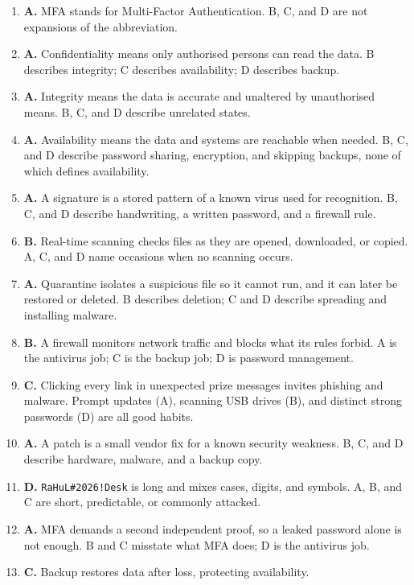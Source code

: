 \begin{enumerate}[label=\textbf{Q\arabic*.}, leftmargin=*]
\item \textbf{A.} MFA stands for Multi-Factor Authentication. B, C, and D are
  not expansions of the abbreviation.
\item \textbf{A.} Confidentiality means only authorised persons can read the
  data. B describes integrity; C describes availability; D describes backup.
\item \textbf{A.} Integrity means the data is accurate and unaltered by
  unauthorised means. B, C, and D describe unrelated states.
\item \textbf{A.} Availability means the data and systems are reachable when
  needed. B, C, and D describe password sharing, encryption, and skipping
  backups, none of which defines availability.
\item \textbf{A.} A signature is a stored pattern of a known virus used for
  recognition. B, C, and D describe handwriting, a written password, and a
  firewall rule.
\item \textbf{B.} Real-time scanning checks files as they are opened,
  downloaded, or copied. A, C, and D name occasions when no scanning occurs.
\item \textbf{A.} Quarantine isolates a suspicious file so it cannot run, and
  it can later be restored or deleted. B describes deletion; C and D describe
  spreading and installing malware.
\item \textbf{B.} A firewall monitors network traffic and blocks what its
  rules forbid. A is the antivirus job; C is the backup job; D is password
  management.
\item \textbf{C.} Clicking every link in unexpected prize messages invites
  phishing and malware. Prompt updates (A), scanning USB drives (B), and
  distinct strong passwords (D) are all good habits.
\item \textbf{A.} A patch is a small vendor fix for a known security
  weakness. B, C, and D describe hardware, malware, and a backup copy.
\item \textbf{D.} \texttt{RaHuL\#2026!Desk} is long and mixes cases, digits,
  and symbols. A, B, and C are short, predictable, or commonly attacked.
\item \textbf{A.} MFA demands a second independent proof, so a leaked
  password alone is not enough. B and C misstate what MFA does; D is the
  antivirus job.
\item \textbf{C.} Backup restores data after loss, protecting availability.

\end{enumerate}
